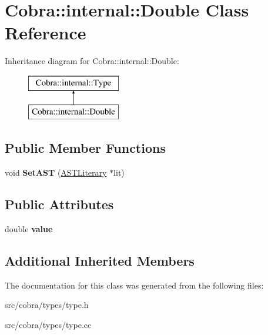 \hypertarget{class_cobra_1_1internal_1_1_double}{\section{Cobra\+:\+:internal\+:\+:Double Class Reference}
\label{class_cobra_1_1internal_1_1_double}
}
Inheritance diagram for Cobra\+:\+:internal\+:\+:Double\+:\begin{figure}[H]
\begin{center}
\leavevmode
\includegraphics[height=2.000000cm]{class_cobra_1_1internal_1_1_double}
\end{center}
\end{figure}
\subsection*{Public Member Functions}
\begin{DoxyCompactItemize}
\item 
\hypertarget{class_cobra_1_1internal_1_1_double_aad901ecbd43067b174f7ba3017ada643}{void {\bfseries Set\+A\+S\+T} (\hyperlink{class_cobra_1_1internal_1_1_a_s_t_literary}{A\+S\+T\+Literary} $\ast$lit)}\label{class_cobra_1_1internal_1_1_double_aad901ecbd43067b174f7ba3017ada643}

\end{DoxyCompactItemize}
\subsection*{Public Attributes}
\begin{DoxyCompactItemize}
\item 
\hypertarget{class_cobra_1_1internal_1_1_double_a2f2896c64ace8ac5a9c82779604d5fd9}{double {\bfseries value}}\label{class_cobra_1_1internal_1_1_double_a2f2896c64ace8ac5a9c82779604d5fd9}

\end{DoxyCompactItemize}
\subsection*{Additional Inherited Members}


The documentation for this class was generated from the following files\+:\begin{DoxyCompactItemize}
\item 
src/cobra/types/type.\+h\item 
src/cobra/types/type.\+cc\end{DoxyCompactItemize}
